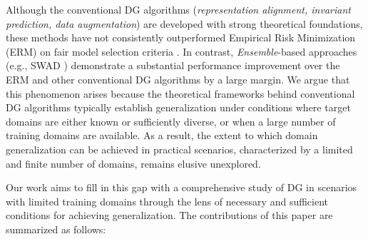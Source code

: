 Although the conventional DG algorithms (\textit{representation alignment, invariant prediction, data augmentation}) are developed with strong theoretical foundations, these methods have not consistently outperformed Empirical Risk Minimization (ERM) on fair model selection criteria \citep{gulrajani2020search, idrissi2022simple, ye2022ood, chen2022does}. In contrast, \textit{Ensemble}-based approaches (e.g., SWAD \citep{cha2021swad})  demonstrate a substantial performance improvement over the ERM  and other conventional DG algorithms by a large margin. We argue that this phenomenon arises because the theoretical frameworks behind conventional DG algorithms typically establish generalization under conditions where target domains are either known or sufficiently diverse, or when a large number of training domains are available. As a result, the extent to which domain generalization can be achieved in practical scenarios, characterized by a limited and finite number of domains, remains elusive unexplored. 
\begin{table*}[t]
\caption{Summary of Conditions for Generalization}
\begin{centering}
\par\end{centering}
\label{tab:conditions}
\end{table*}
Our work aims to fill in this gap with a comprehensive study of DG in scenarios with limited training domains through the lens of necessary and sufficient conditions for achieving generalization. The contributions of this paper are summarized as follows:

